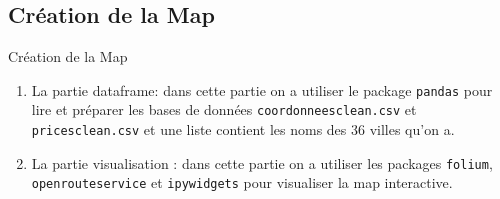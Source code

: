 \documentclass{beamer}
\begin{document}
\subsection{Création de la Map}

\begin{frame}{Création de la Map}

\begin{enumerate}

    \item La partie dataframe: dans cette partie on a utiliser le package \texttt{pandas} pour lire et préparer les bases de données \texttt{coordonnees\underline{}clean.csv} et \texttt{prices\underline{}clean.csv} et une liste contient les noms des 36 villes qu'on a.\newline
    
    \item La partie visualisation : dans cette partie on a utiliser les packages \texttt{folium}, \texttt{openrouteservice} et \texttt{ipywidgets} pour visualiser la map interactive. 


\end{enumerate}

\end{frame}
\end{document}

